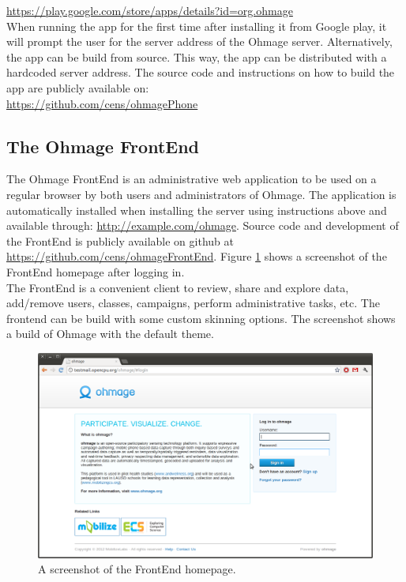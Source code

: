 \documentclass{scrartcl}
\begin{document}
\url{https://play.google.com/store/apps/details?id=org.ohmage} \\

When running the app for the first time after installing it from Google play, it
will prompt the user for the server address of the Ohmage server.
Alternatively, the app can be build from source. This way, the app can be
distributed with a hardcoded server address. The source code and instructions on
how to build the app are publicly available on: \\

\url{https://github.com/cens/ohmagePhone} \\

\subsection{The Ohmage FrontEnd}

The Ohmage FrontEnd is an administrative web application to be used on a regular
browser by both users and administrators of Ohmage. The application is
automatically installed when installing the server using instructions above and
available through: \url{http://example.com/ohmage}. Source code and
development of the FrontEnd is publicly available on github at
\url{https://github.com/cens/ohmageFrontEnd}. Figure \ref{fig:frontend} shows a
screenshot of the FrontEnd homepage after logging in. \\

\noindent The FrontEnd is a convenient client to review, share and explore data,
add/remove users, classes, campaigns, perform administrative tasks, etc. The
frontend can be build with some custom skinning options. The screenshot shows a build of
Ohmage with the default theme.

\begin{figure}[h!]
\begin{center}
\includegraphics[width=15cm]{frontend.png}
\caption{A screenshot of the FrontEnd homepage.}
\label{fig:frontend}
\end{center}
\end{figure}
\end{document}
